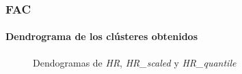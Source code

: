 \subsubsection{FAC}

\paragraph{Dendrograma de los clústeres obtenidos}

\begin{figure}[H]
    \centering
    
    \caption{Dendogramas de \textit{HR}, \textit{HR\_scaled} y \textit{HR\_quantile}}
    \label{fig:acf_den_fc}
\end{figure}

